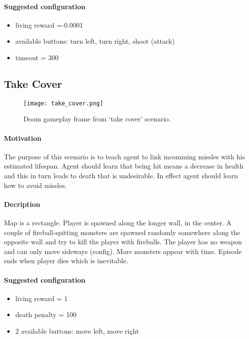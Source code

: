 		\paragraph{Suggested configuration}
		\begin{itemize}
			\item living reward =-0.0001
			\item available buttons: turn left, turn right, shoot (attack)
			\item timeout = 300
		\end{itemize}
	\newpage

	\subsection{Take Cover}
		\begin{figure}
			\centering
			\texttt{[image: take\_cover.png]}
			\caption{Doom gameplay frame from `take cover' scenario.}
		\end{figure}
		\paragraph{Motivation} 
			The purpose of this scenario is to teach agent to link incomming missles with his estimated lifespan. Agent should learn that being hit means a decrease in health and this in turn leads to death that is undesirable. In effect agent should learn how to avoid missles.

		\paragraph{Decription}
			Map is a rectangle. Player is spawned along the longer wall, in the center. A couple of fireball-spitting monsters are spawned randomly somewhere along the opposite wall and try to kill the player with fireballs. The player has no weapon and can only move sideways (config). More monsters appear with time. Episode ends when player dies which is inevitable.

		\paragraph{Suggested configuration}
		\begin{itemize}
			\item living reward = 1
			\item death penalty = 100
			\item 2 available buttons: move left, move right
		\end{itemize}
	\newpage


